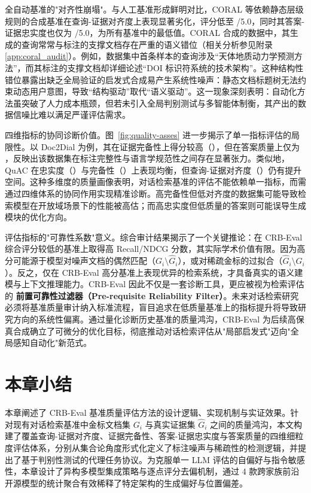 全自动基准的"对齐性崩塌"。与人工基准形成鲜明对比，CORAL 等依赖静态层级规则的合成基准在查询-证据对齐度上表现显著劣化，评分低至 /5.0，同时其答案-证据忠实度也仅为 /5.0，为所有基准中的最低值。CORAL 合成的数据中，其生成的查询常常与标注的支撑文档存在严重的语义错位（相关分析参见附录\ref{app:coral_audit}）。例如，数据集中首条样本的查询涉及“天体地质动力学预测方法”，而其标注的支撑文档却详细论述“DOI 标识符系统的技术架构”。这种结构性错位暴露出缺乏全局验证的启发式合成易产生系统性噪声：静态文档标题树无法约束动态用户意图，导致“结构驱动”取代“语义驱动”。这一现象深刻表明：自动化方法虽突破了人力成本瓶颈，但若未引入全局判别测试与多智能体制衡，其产出的数据信噪比难以满足严谨评估需求。



四维指标的协同诊断价值。图~\ref{fig:quality-asses} 进一步揭示了单一指标评估的局限性。以 Doc2Dial 为例，其在证据完备性上得分较高（\TBD{}），但在答案质量上仅为 \TBD{}，反映出该数据集在标注完整性与语言学规范性之间存在显著张力。类似地，QuAC 在忠实度（\TBD{}）与完备性（\TBD{}）上表现均衡，但查询-证据对齐度（\TBD{}）仍有提升空间。这种多维度的质量画像表明，对话检索基准的评估不能依赖单一指标，而需通过四维体系的协同作用实现精准诊断。高完备性但低对齐度的数据集可能导致检索模型在开放域场景下的性能被高估；而高忠实度但低质量的答案则可能误导生成模块的优化方向。


评估指标的"可靠性系数"意义。综合审计结果揭示了一个关键推论：在 CRB-Eval 综合评分较低的基准上取得高 Recall/NDCG 分数，其实际学术价值有限。因为高分可能源于模型对噪声文档的偶然匹配（$G_i \setminus \hat{G}_i$），或对稀疏金标的过拟合（$\hat{G}_i \setminus G_i$）。反之，仅在 CRB-Eval 高分基准上表现优异的检索系统，才具备真实的语义建模与上下文推理能力。CRB-Eval 因此不仅是一套诊断工具，更应被视为检索评估的 \textbf{前置可靠性过滤器（Pre-requisite Reliability Filter）}。未来对话检索研究必须将基准质量审计纳入标准流程，盲目追求在低质量基准上的指标提升将导致研究方向的系统性偏离。通过量化诊断历史基准的质量鸿沟，CRB-Eval 为后续高保真合成确立了可微分的优化目标，彻底推动对话检索评估从"局部启发式"迈向"全局感知自动化"新范式。







\section{本章小结}



本章阐述了 CRB-Eval 基准质量评估方法的设计逻辑、实现机制与实证效果。针对现有对话检索基准中金标文档集 $G_i$ 与真实证据集 $\hat{G}_i$ 之间的质量鸿沟，本文构建了覆盖查询-证据对齐度、证据完备性、答案-证据忠实度与答案质量的四维细粒度评估体系，分别从集合论角度形式化定义了标注噪声与稀疏性的检测逻辑，并提出了基于判别性测试的代理任务协议。为克服单一 LLM 评估的自偏好与指令敏感性，本章设计了异构多模型集成策略与逐点评分去偏机制，通过 4 款跨家族前沿开源模型的统计聚合有效稀释了特定架构的生成偏好与位置偏差。



